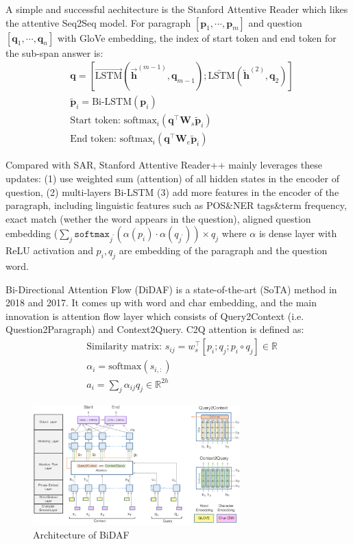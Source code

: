 A simple and successful aechitecture is the Stanford Attentive Reader  which likes the attentive Seq2Seq model.
For paragraph $[\bm{p}_1, \cdots, \bm{p}_m]$ and question $[\bm{q}_1, \cdots, \bm{q}_n]$ with GloVe embedding, the index of start token and end token for the sub-span answer is:
\begin{align}
&\bm{q} = [\overrightarrow{\text{LSTM}}(\overrightarrow{\bm{h}}^{(m-1)}, \bm{q}_{m-1}); \overleftarrow{\text{LSTM}}(\overleftarrow{\bm{h}}^{(2)}, \bm{q}_{2})] \nonumber \\
&\tilde{\bm{p}}_i = \text{Bi-LSTM}(\bm{p}_i) \nonumber \\
&\text{Start token: } \text{softmax}_i (\bm{q}^\top \bm{W}_s \tilde{\bm{p}}_i) \nonumber \\
&\text{End token: } \text{softmax}_i (\bm{q}^\top \bm{W}_e \tilde{\bm{p}}_i) \nonumber
\end{align}

Compared with SAR, Stanford Attentive Reader++  mainly leverages these updates: (1) use weighted sum (attention) of all hidden states in the encoder of question, (2) multi-layers Bi-LSTM (3) add more features in the encoder of the paragraph, including linguistic features such as POS\&NER tags\&term frequency, exact match (wether the word appears in the question), aligned question embedding ($\sum_j \texttt{softmax}_{j^\prime}(\alpha(p_i) \cdot \alpha(q_{j^\prime})) \times q_j$ where $\alpha$ is dense layer with ReLU activation and $p_i, q_j$ are embedding of the paragraph and the question word.

Bi-Directional Attention Flow (DiDAF)  is a state-of-the-art (SoTA) method in 2018 and 2017.
It comes up with word and char embedding, and the main innovation is attention flow layer which consists of Query2Context (i.e. Question2Paragraph) and Context2Query.
C2Q attention is defined as:
\begin{align}
&\text{Similarity matrix: } s_{ij} = w_s^\top [p_i; q_j; p_i \circ q_j] \in \mathbb{R} \\
&\alpha_i = \text{softmax}(s_{i,:}) \\
&a_i = \sum_j \alpha_{ij} q_j \in \mathbb{R}^{2h} 
\end{align}

\begin{figure}[!thp]
	\centerline{\includegraphics[width=8.0cm]{figs/BiDAF.png}}
	\caption{Architecture of BiDAF}
	\label{fig:bidaf}
\end{figure}

